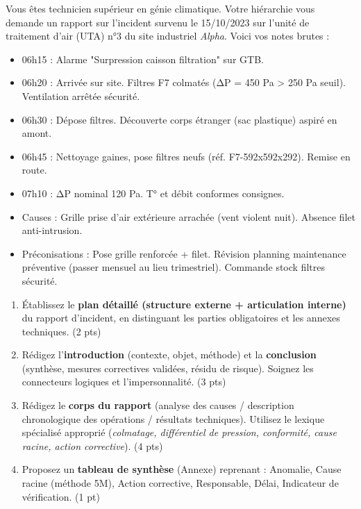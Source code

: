 \documentclass[11pt]{article}
\begin{document}
\begin{exercice}
Vous êtes technicien supérieur en génie climatique. Votre hiérarchie vous demande un rapport sur l'incident survenu le 15/10/2023 sur l'unité de traitement d'air (UTA) n°3 du site industriel \textit{Alpha}. Voici vos notes brutes :

\begin{itemize}
    \item 06h15 : Alarme "Surpression caisson filtration" sur GTB.
    \item 06h20 : Arrivée sur site. Filtres F7 colmatés (ΔP = 450 Pa > 250 Pa seuil). Ventilation arrêtée sécurité.
    \item 06h30 : Dépose filtres. Découverte corps étranger (sac plastique) aspiré en amont.
    \item 06h45 : Nettoyage gaines, pose filtres neufs (réf. F7-592x592x292). Remise en route.
    \item 07h10 : ΔP nominal 120 Pa. T° et débit conformes consignes.
    \item Causes : Grille prise d'air extérieure arrachée (vent violent nuit). Absence filet anti-intrusion.
    \item Préconisations : Pose grille renforcée + filet. Révision planning maintenance préventive (passer mensuel au lieu trimestriel). Commande stock filtres sécurité.
\end{itemize}

\begin{enumerate}
    \item Établissez le \textbf{plan détaillé (structure externe + articulation interne)} du rapport d'incident, en distinguant les parties obligatoires et les annexes techniques. (2 pts)
    \item Rédigez l'\textbf{introduction} (contexte, objet, méthode) et la \textbf{conclusion} (synthèse, mesures correctives validées, résidu de risque). Soignez les connecteurs logiques et l'impersonnalité. (3 pts)
    \item Rédigez le \textbf{corps du rapport} (analyse des causes / description chronologique des opérations / résultats techniques). Utilisez le lexique spécialisé approprié (\textit{colmatage, différentiel de pression, conformité, cause racine, action corrective}). (4 pts)
    \item Proposez un \textbf{tableau de synthèse} (Annexe) reprenant : Anomalie, Cause racine (méthode 5M), Action corrective, Responsable, Délai, Indicateur de vérification. (1 pt)
\end{enumerate}
\end{exercice}
\end{document}
